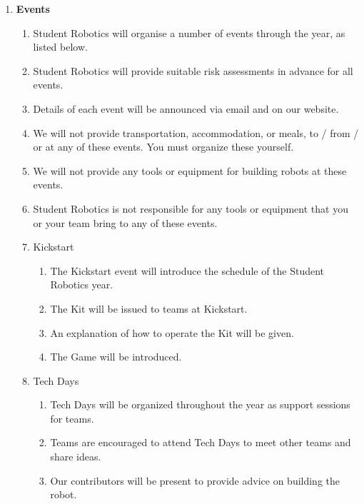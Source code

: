 \documentclass[a4paper, 11pt]{scrartcl}
\begin{document}
\begin{enumerate}
\item \textbf{Events}
\begin{enumerate}

\item Student Robotics will organise a number of events through the year, as
listed below.

\item Student Robotics will provide suitable risk assessments in advance for all events.

\item Details of each event will be announced via email and on our website.

\item We will not provide transportation, accommodation, or meals,
to / from / or at any of these events. You must organize these yourself.

\item We will not provide any tools or equipment for building robots at these
events.

\item Student Robotics is not responsible for any tools or equipment that you
or your team bring to any of these events.

\item Kickstart

\begin{enumerate}
\item The Kickstart event will introduce the schedule of the Student Robotics
year.

\item The Kit will be issued to teams at Kickstart.

\item An explanation of how to operate the Kit will be given.

\item The Game will be introduced.
\end{enumerate}

\item Tech Days

\begin{enumerate}
\item Tech Days will be organized throughout the year as support sessions for
teams.

\item Teams are encouraged to attend Tech Days to meet other teams and share
ideas.

\item Our contributors will be present to provide advice on building the robot.
\end{enumerate}


\end{enumerate}
\end{enumerate}
\end{document}
